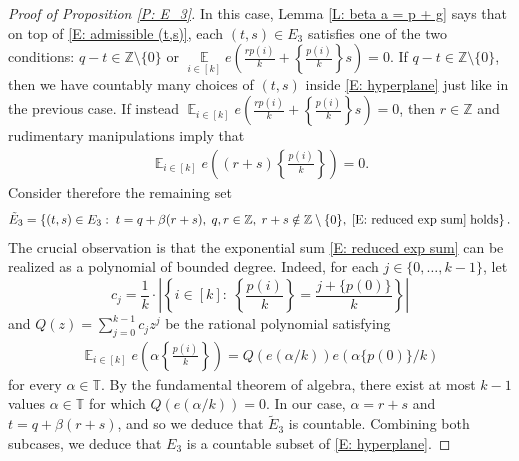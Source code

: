 \documentclass[11pt]{amsart}
\theoremstyle{definition}
\DeclareMathOperator*{\E}{\mathbb{E}}
\newcommand{\T}{{\mathbb T}}
\newcommand{\Z}{{\mathbb Z}}
\newcommand{\1}{{\mathbf{1}}}
\newcommand{\abs}[1]{\mathopen{}\left| #1\mathclose{}\right|}
\newcommand{\brac}[1]{\mathopen{}\left( #1 \mathclose{}\right)}
\newcommand{\rem}[1]{\left \{ #1 \right \}}
\begin{document}
\begin{proof}[Proof of Proposition \ref{P: E_3}]
    In this case, Lemma \ref{L: beta a  = p + g} says that on top of \eqref{E: admissible (t,s)}, each $(t,s)\in E_3$ satisfies one of the two conditions:
       $q-t\in\Z\setminus\{0\}$ or $\E\limits_{i\in[{k}]}e\brac{\frac{r p(i)}{k}+ \rem{\frac{p(i)}{k}}s}=0$. If $q-t\in\Z\setminus\{0\}$, then  we have countably many choices of $(t,s)$ inside \eqref{E: hyperplane} just like in the previous case.
        If instead $\E_{i\in[k]}e\brac{\frac{r p(i)}{k}+ \rem{\frac{p(i)}{k}}s}=0$, then $r\in\Z$ and rudimentary manipulations imply that
        \begin{align}\label{E: reduced exp sum}
            \E_{i\in[k]} e\brac{(r+s)\rem{\frac{p(i)}{k}}} = 0.    
        \end{align}
         Consider therefore the remaining set
        \begin{align*}
            \tilde{E}_3 = \left\{(t,s)\in E_3:\; t = q+ \beta (r+s),\; q,r\in\Z,\; r+s\notin\Z\setminus\{0\},\; \eqref{E: reduced exp sum}\; \textrm{holds}\right\}.
        \end{align*}
        The crucial observation is that the exponential sum \eqref{E: reduced exp sum} can be realized as a polynomial of bounded degree. Indeed, for each $j\in\{0,\ldots, k-1\}$, let
        $$c_j =\frac{1}{k}\cdot \abs{\rem{i\in[k]:\; \rem{\frac{p(i)}{k}} = \frac{j+\{p(0)\}}{k}}}$$ and $Q(z) = \sum\limits_{j=0}^{k-1} c_j z^j$ be the rational polynomial satisfying
        \begin{align*}
            \E_{i\in[k]} e\brac{\alpha\rem{\frac{p(i)}{k}}} = Q(e(\alpha/k)){e(\alpha \{p(0)\}/k)}
        \end{align*}
        for every $\alpha\in\T$. By the fundamental theorem of algebra, there exist at most $k-1$ values $\alpha\in\T$ for which $Q(e(\alpha/k)) = 0$. In our case, $\alpha = r+ s$ and $t = q +\beta (r+s)$, and so we deduce that $\tilde{E}_3$ is countable. Combining both subcases, we deduce that $E_3$ is a countable subset of \eqref{E: hyperplane}.   




\end{proof}
\end{document}
